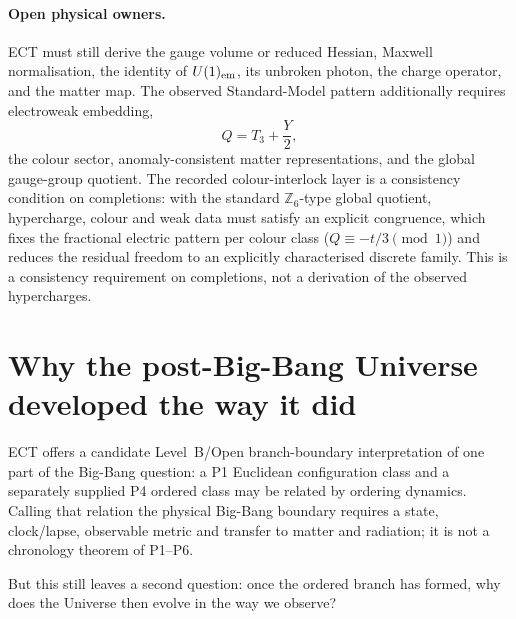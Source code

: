 \documentclass[11pt,a4paper]{article}
\begin{document}
\paragraph{Open physical owners.}
ECT must still derive the gauge volume or reduced Hessian, Maxwell
normalisation, the identity of $U(1)_{\rm em}$, its unbroken photon,
the charge operator, and the matter map.  The observed Standard-Model
pattern additionally requires electroweak embedding,
\[
Q = T_3 + \frac{Y}{2},
\]
the colour sector, anomaly-consistent matter representations, and the
global gauge-group quotient.  The recorded colour-interlock layer is a
consistency condition on completions: with the
standard $\mathbb{Z}_6$-type global quotient, hypercharge, colour
and weak data must satisfy an explicit congruence, which fixes the
fractional electric pattern per colour class
($Q \equiv -t/3 \pmod 1$) and reduces the residual freedom to an
explicitly characterised discrete family. This is a consistency
requirement on completions, not a derivation of the observed
hypercharges.

\section{Why the post-Big-Bang Universe developed the way it did}
\label{sec:pop_post_transition}

ECT offers a candidate Level~B/Open branch-boundary interpretation of one
part of the Big-Bang question: a P1 Euclidean configuration class and a
separately supplied P4 ordered class may be related by ordering dynamics.
Calling that relation the physical Big-Bang boundary requires a state,
clock/lapse, observable metric and transfer to matter and radiation; it is
not a chronology theorem of P1--P6.

But this still leaves a second question: once the ordered branch
has formed, why does the Universe then evolve in the way we observe?
\end{document}
